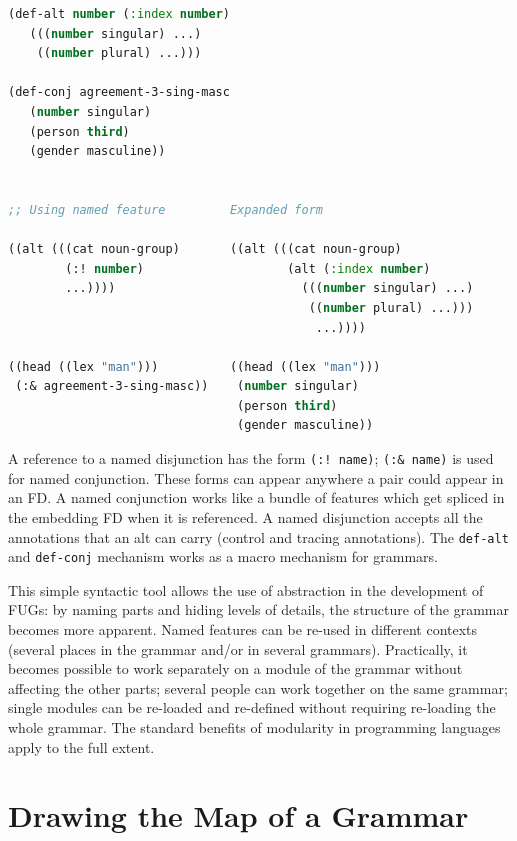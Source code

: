 \documentclass[10pt,a4paper]{report}
\begin{document}
\begin{lstlisting}[language=Lisp]
(def-alt number (:index number)
   (((number singular) ...)
    ((number plural) ...)))

(def-conj agreement-3-sing-masc
   (number singular)
   (person third)
   (gender masculine))


;; Using named feature         Expanded form

((alt (((cat noun-group)       ((alt (((cat noun-group)
        (:! number)                    (alt (:index number)
        ...))))                          (((number singular) ...)
                                          ((number plural) ...)))
                                           ...))))

((head ((lex "man")))          ((head ((lex "man")))
 (:& agreement-3-sing-masc))    (number singular)
                                (person third)
                                (gender masculine))
\end{lstlisting}


A reference to a named disjunction has the form {\tt (:! name)}; {\tt (:\&
name)} is used for named conjunction.  These forms can appear anywhere a
pair could appear in an FD.  A named conjunction works like a bundle of
features which get spliced in the embedding FD when it is referenced.  A
named disjunction accepts all the annotations that an alt can carry
(control and tracing annotations).  The {\tt def-alt} and {\tt def-conj}
mechanism works as a macro mechanism for grammars.

This simple syntactic tool allows the use of abstraction in the development
of \textsc{FUG}s: by naming parts and hiding levels of details, the structure of
the grammar becomes more apparent.  Named features can be re-used in
different contexts (several places in the grammar and/or in several
grammars).  Practically, it becomes possible to work separately on a module
of the grammar without affecting the other parts; several people can work
together on the same grammar; single modules can be re-loaded and
re-defined without requiring re-loading the whole grammar.  The standard
benefits of modularity in programming languages apply to the full extent.

\section{Drawing the Map of a Grammar}
\end{document}

